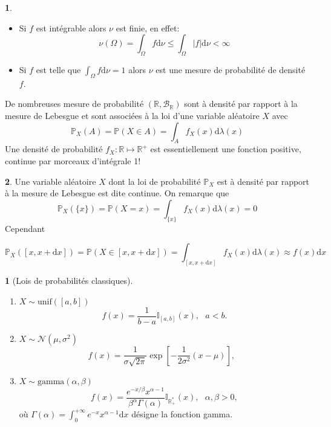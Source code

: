 \documentclass[8pt,notheorems]{beamer}
\def \R{\mathbb{R}}
\def \P {\mathbb P}
\theoremstyle{definition}
\theoremstyle{example}
\newtheorem{example}{\translate{Exemple}}
\newtheorem{remark}{\translate{Remarque}}
\theoremstyle{mystyle}
\theoremstyle{plain}
\begin{document}
\begin{frame}[allowframebreaks]
\begin{remark}
\begin{itemize}
    \item Si $f$ est intégrable alors $\nu$ est finie, en effet:
    $$
    \nu(\Omega) = \int_\Omega f\text{d}\nu \leq \int_\Omega |f|\text{d}\nu <\infty
    $$
    \item Si $f$ est telle que $\int_\Omega f\text{d}\nu = 1$ alors $\nu$ est une mesure de probabilité de densité $f$.  
\end{itemize}
\end{remark}
De nombreuses mesure de probabilité $(\R,\mathcal{B}_\R)$ sont à densité par rapport à la mesure de Lebesgue et sont associées à la loi d'une variable aléatoire $X$ avec 
$$
\mathbb{P}_X(A) =\mathbb{P}(X\in A)= \int_{A} f_{X}(x)\text{d}\lambda(x)
$$
Une densité de probabilité $f_X:\R\mapsto \R^+$ est essentiellement une fonction positive, continue par morceaux d'intégrale 1!
\begin{remark}
Une variable aléatoire $X$ dont la loi de probabilité $\P_X$ est à densité par rapport à la mesure de Lebesgue est dite continue. On remarque que 
$$
\P_X(\{x\}) =\P(X = x)=\int_{\{x\}}f_X(x)\text{d}\lambda(x) = 0 
$$
Cependant

$$
\P_X([x, x+\text{d}x]) =\P(X \in [x, x+\text{d}x])=\int_{[x, x+\text{d}x]}f_X(x)\text{d}\lambda(x) \approx f(x)\text{d}x 
$$

\end{remark}
\begin{example}[Lois de probabilités classiques]
\begin{enumerate}
    \item $X\sim\text{unif}([a,b])$
    $$
    f(x) = \frac{1}{b-a}\mathbb{I}_{[a,b]}(x),\text{ }a<b.
    $$
    \item $X\sim\mathcal{N}(\mu, \sigma^2)$
    $$
    f(x) = \frac{1}{\sigma\sqrt{2\pi}}\exp\left[-\frac{1}{2\sigma^2}(x-\mu)\right],\text{ }
    $$
    \item $X\sim \text{gamma}(\alpha, \beta)$
    $$
    f(x) = \frac{e^{-x/\beta}x^{\alpha -1}}{\beta^{\alpha}\Gamma(\alpha)}\mathbb{I}_{\R_{+}^\ast}(x),\text{ }\alpha,\beta >0,
    $$ 
    où $\Gamma(\alpha) = \int_0^{+\infty}e^{-x}x^{\alpha-1}\text{d}x$ désigne la fonction gamma.
\end{enumerate}
\end{example}
\end{frame}
\end{document}
